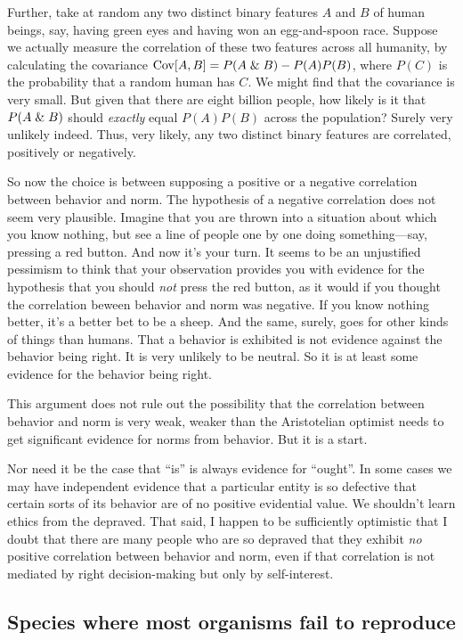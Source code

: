 Further, take at random any two distinct binary features $A$ and $B$ of human beings, say, 
having green eyes and having won an egg-and-spoon race. Suppose we actually measure the correlation of these two features 
across all humanity, by calculating the covariance $\operatorname{Cov}[A,B]=P(A\mathrel{\&} B)-P(A)P(B)$, where $P(C)$ is the probability that a random human has
$C$. We might find that the covariance is very small. But given that there are eight billion people, how likely is it that $P(A\mathrel{\&} B)$ should
\textit{exactly} equal $P(A)P(B)$ across the population? Surely very unlikely indeed. Thus, very likely, any two distinct binary features
are correlated, positively or negatively.

So now the choice is between supposing a positive or a negative correlation between behavior and norm. The hypothesis of a negative 
correlation does not seem very plausible. Imagine that you are thrown into a situation about which you know nothing, but see a line of people
one by one doing something---say, pressing a red button. And now it's your turn. It seems to be an unjustified pessimism to think that your 
observation provides you with evidence for the hypothesis that you should \textit{not} press the red button, as it would if you thought
the correlation beween behavior and norm was negative. If you know nothing better, it's a better bet to be a sheep. And the same, surely,
goes for other kinds of things than humans. That a behavior is exhibited is not evidence against the behavior being right. It is very unlikely
to be neutral. So it is at least some evidence for the behavior being right.

This argument does not rule out the possibility that the correlation between behavior and norm is very weak, weaker than the Aristotelian
optimist needs to get significant evidence for norms from behavior. But it is a start.

Nor need it be the case that ``is'' is always evidence for ``ought''. In some cases we may have independent evidence that a particular
entity is so defective that certain sorts of its behavior are of no positive evidential value. We shouldn't learn ethics from the 
depraved. That said, I happen to be sufficiently optimistic that I doubt that there are many people who are so depraved that they exhibit
\textit{no} positive correlation between behavior and norm, even if that correlation is not mediated by right decision-making but only
by self-interest.

\subsection{Species where most organisms fail to reproduce}

